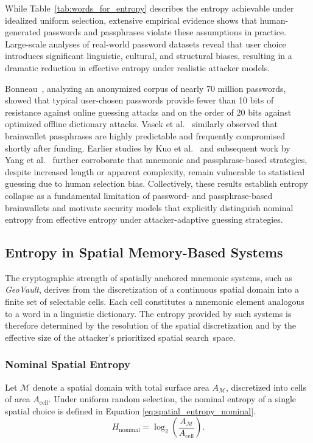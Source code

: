 \documentclass[mathematics,article,accept,pdftex,moreauthors]{Definitions/mdpi}
\begin{document}
While Table~\ref{tab:words_for_entropy} describes the entropy achievable under idealized uniform selection, extensive empirical evidence shows that human-generated passwords and passphrases violate these assumptions in practice. Large-scale analyses of real-world password datasets reveal that user choice introduces significant linguistic, cultural, and structural biases, resulting in a dramatic reduction in effective entropy under realistic attacker models.

Bonneau~\cite{Bonneau2012}, analyzing an anonymized corpus of nearly 70 million passwords, showed that typical user-chosen passwords provide fewer than 10 bits of resistance against online guessing attacks and on the order of 20 bits against optimized offline dictionary attacks. Vasek et al.~\cite{Vasek2017} similarly observed that brainwallet passphrases are highly predictable and frequently compromised shortly after funding. Earlier studies by Kuo et al.~\cite{Kuo2006} and subsequent work by Yang et al.~\cite{Yang2016} further corroborate that mnemonic and passphrase-based strategies, despite increased length or apparent complexity, remain vulnerable to statistical guessing due to human selection bias. Collectively, these results establish entropy collapse as a fundamental limitation of password- and passphrase-based brainwallets and motivate security models that explicitly distinguish nominal entropy from effective entropy under attacker-adaptive guessing strategies.

\subsection{Entropy in Spatial Memory-Based Systems\label{sec3.2}}

The cryptographic strength of spatially anchored mnemonic systems, such as \textit{GeoVault}, derives from the discretization of a continuous spatial domain into a finite set of selectable cells. Each cell constitutes a mnemonic element analogous to a word in a linguistic dictionary. The entropy provided by such systems is therefore determined by the resolution of the spatial discretization and by the effective size of the attacker’s prioritized spatial \mbox{search space.}

\subsubsection{Nominal Spatial Entropy}

Let $\mathcal{M}$ denote a spatial domain with total surface area $A_{\mathcal{M}}$, discretized into cells of area $A_{\text{cell}}$. Under uniform random selection, the nominal entropy of a single spatial choice is defined in Equation \eqref{eq:spatial_entropy_nominal}.
\begin{equation}
H_{\text{nominal}} = \log_2\!\left(\frac{A_{\mathcal{M}}}{A_{\text{cell}}}\right).
\label{eq:spatial_entropy_nominal}
\end{equation}
\end{document}
